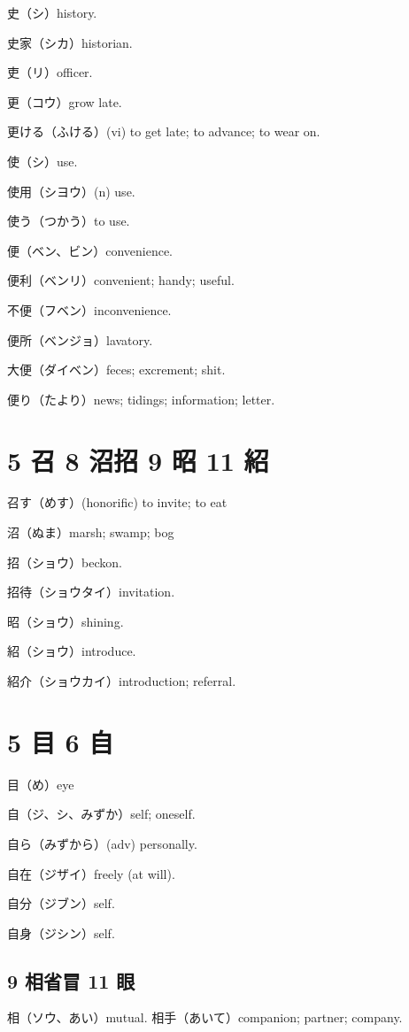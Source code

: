 史（シ）history.

史家（シカ）historian.

吏（リ）officer.

更（コウ）grow late.

更ける（ふける）(vi) to get late; to advance; to wear on.

使（シ）use.

使用（シヨウ）(n) use.

使う（つかう）to use.

便（ベン、ビン）convenience.

便利（ベンリ）convenient; handy; useful.

不便（フベン）inconvenience.

便所（ベンジョ）lavatory.

大便（ダイベン）feces; excrement; shit.

便り（たより）news; tidings; information; letter.

\section{5 召 8 沼招 9 昭 11 紹}

召す（めす）(honorific) to invite; to eat

沼（ぬま）marsh; swamp; bog

招（ショウ）beckon.

招待（ショウタイ）invitation.

昭（ショウ）shining.

紹（ショウ）introduce.

紹介（ショウカイ）introduction; referral.

\section{5 目 6 自}

目（め）eye

自（ジ、シ、みずか）self; oneself.

自ら（みずから）(adv) personally.

自在（ジザイ）freely (at will).

自分（ジブン）self.

自身（ジシン）self.

\subsection{9 相省冒 11 眼}

相（ソウ、あい）mutual.
相手（あいて）companion; partner; company.

